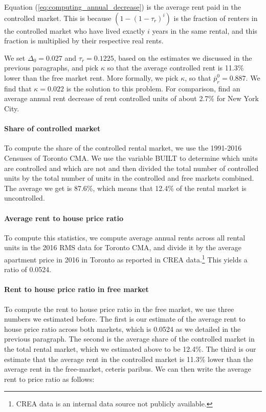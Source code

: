 \documentclass[parskip=full]{article}
\begin{document}
\noindent Equation (\ref{eq:computing_annual_decrease}) is the average rent paid in the controlled market. This is because $(1-(1-\tau_{r})^{i})$ is the fraction of renters in the controlled market who have lived exactly $i$ years in the same rental, and this fraction is multiplied by their respective real rents.

We set $\Delta_{0}=0.027$ and $\tau_{r}=0.1225$, based on the estimates we discussed in the previous paragraphs, and pick $\kappa$ so that the average controlled rent is 11.3\% lower than the free market rent. More formally, we pick $\kappa$, so that $\overline{p}^{0}_{r}=0.887$. We find that $\kappa=0.022$ is the solution to this problem. For comparison, \citet{fmn-2022} find an average annual rent decrease of rent controlled units of about 2.7\% for New York City.

\paragraph{Share of controlled market}

To compute the share of the controlled rental market, we use the 1991-2016 Censuses of Toronto CMA. We use the variable BUILT to determine which units are controlled and which are not and then divided the total number of controlled units by the total number of units in the controlled and free markets combined. The average we get is 87.6\%, which means that 12.4\% of the rental market is uncontrolled. 

\paragraph{Average rent to house price ratio}

To compute this statistics, we compute average annual rents across all rental units in the 2016 RMS data for Toronto CMA, and divide it by the average apartment price in 2016 in Toronto as reported in CREA data.\footnote{CREA data is an internal data source not publicly available.} This yields a ratio of 0.0524.

\paragraph{Rent to house price ratio in free market}

To compute the rent to house price ratio in the free market, we use three numbers we estimated before. The first is our estimate of the average rent to house price ratio across both markets, which is 0.0524 as we detailed in the previous paragraph. The second is the average share of the controlled market in the total rental market, which we estimated above to be 12.4\%. The third is our estimate that the average rent in the controlled market is 11.3\% lower than the average rent in the free-market, ceteris paribus. We can then write the average rent to price ratio as follows:
\end{document}
